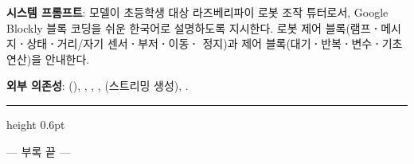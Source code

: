 \noindent\textbf{시스템 프롬프트}: 모델이 초등학생 대상 라즈베리파이 로봇 조작
튜터로서, Google Blockly 블록 코딩을 쉬운 한국어로 설명하도록 지시한다.
로봇 제어 블록(램프\textbf{·}메시지\textbf{·}상태\textbf{·}거리/자기 센서\textbf{·}부저\textbf{·}이동\textbf{·}
정지)과 제어 블록(대기\textbf{·}반복\textbf{·}변수\textbf{·}기초 연산)을 안내한다.

\noindent\textbf{외부 의존성}: (),
, ,
, (스트리밍 생성),
.

\vspace{2em}
{\color{rulegray}\hrule height 0.6pt}
\vspace{0.5em}
\begin{flushright}
\small\sffamily\color{rulegray}
--- 부록 끝 ---
\end{flushright}
